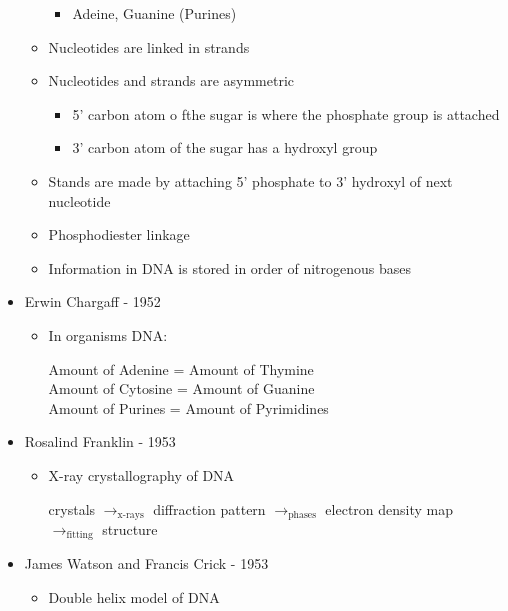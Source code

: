 \documentclass[12pt]{article}
\begin{document}
\begin{itemize}
\begin{itemize}
\begin{itemize}
                \item Adeine, Guanine (Purines)
            \end{itemize} 
            \item Nucleotides are linked in strands
            \item Nucleotides and strands are asymmetric
            \begin{itemize}
                \item 5' carbon atom o fthe sugar is where the phosphate group is attached
                \item 3' carbon atom of the sugar has a hydroxyl group
            \end{itemize}
            \item Stands are made by attaching 5' phosphate to 3' hydroxyl of next nucleotide
            \item Phosphodiester linkage
            \item Information in DNA is stored in order of nitrogenous bases
        \end{itemize}
        \item Erwin Chargaff - 1952
        \begin{itemize}
            \item In organisms DNA:
            \begin{center}
                Amount of Adenine = Amount of Thymine \\
                Amount of Cytosine = Amount of Guanine \\
                Amount of Purines = Amount of Pyrimidines
            \end{center}
        \end{itemize}
        \item Rosalind Franklin - 1953
        \begin{itemize}
            \item X-ray crystallography of DNA
            \begin{center}
                crystals $\rightarrow_{\text{x-rays}}$ diffraction pattern $\rightarrow_{\text{phases}}$ electron density map $\rightarrow_{\text{fitting}}$ structure
            \end{center}
        \end{itemize}
        \item James Watson and Francis Crick - 1953
        \begin{itemize}
            \item Double helix model of DNA

\end{itemize}
\end{itemize}
\end{document}
